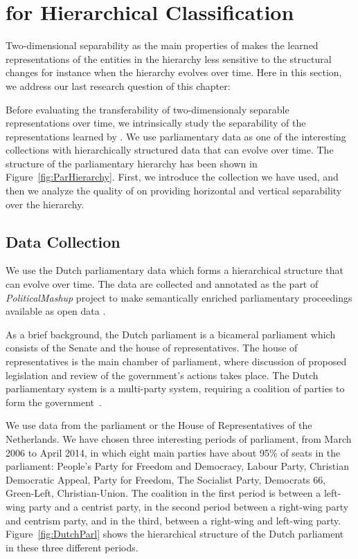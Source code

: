\section{\achswlm for Hierarchical Classification}
Two-dimensional separability as the main properties of \achswlm makes the learned representations of the entities in the hierarchy less sensitive to the structural changes for instance when the hierarchy evolves over time. Here in this section, we address our last research question of this chapter:

Before evaluating the transferability of two-dimensionaly separable representations over time, we intrinsically study the separability of the representations learned by \achswlm. We use parliamentary data as one of the interesting collections with hierarchically structured data that can evolve over time. The structure of the parliamentary hierarchy has been shown in Figure~\ref{fig:ParHierarchy}.  First, we introduce the collection we have used, and then we analyze the quality of \achswlm on providing horizontal and vertical separability over the hierarchy. 

\subsection{Data Collection}
We use the Dutch parliamentary data which forms a hierarchical structure that can evolve over time. The data are collected and annotated as the part of
\emph{Political\-Mashup} project \citep{url:politicalmashup} to make semantically enriched parliamentary proceedings available as open data \citep{marx:2010}.

As a brief background, the Dutch parliament is a bicameral parliament which consists of the Senate and the house of representatives. The house of representatives is the main chamber of parliament, where discussion of proposed legislation and review of the government's actions takes place.  The Dutch parliamentary system is a multi-party system, requiring a coalition of parties to form the government~\citep{deswaan73}.


We use data from the parliament or the House of Representatives of the Netherlands.  We have chosen three interesting periods of parliament, from March 2006 to April 2014, in which eight main parties have about 95\% of seats in the parliament: People's Party for Freedom and Democracy, Labour Party, Christian Democratic Appeal, Party for Freedom, The Socialist Party, Democrats 66, Green-Left, Christian-Union.   The coalition in the first period is between a left-wing party and a centrist party, in the second period between a right-wing party and centrism party, and in the third, between a right-wing and left-wing party. Figure~\ref{fig:DutchParl} shows the hierarchical structure of the Dutch parliament in these three different periods.

